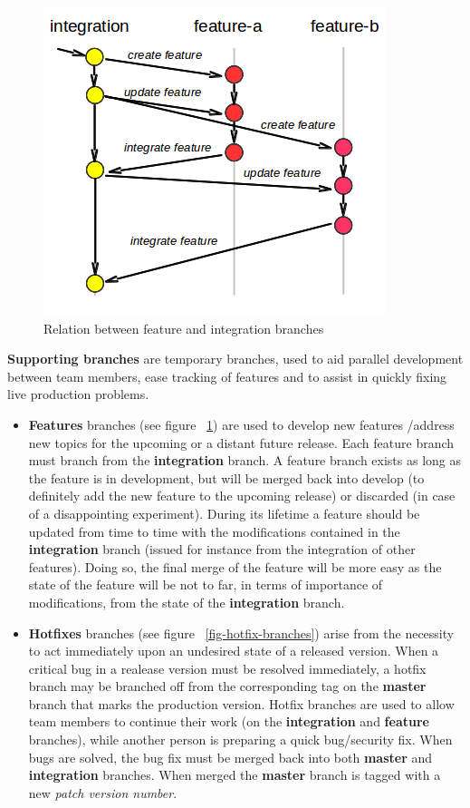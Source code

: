 \documentclass[12pt,a4paper]{article}
\begin{document}
\begin{figure}
\center
\includegraphics[scale=1]{images/feature_branching.png}
\caption{Relation between feature and integration branches}
\label{fig-feature-branches}
\end{figure}

\textbf{Supporting branches} are temporary branches, used to aid parallel development between team members, ease tracking of features and to assist in quickly fixing live production problems.
\begin{itemize}
\item \textbf{Features} branches (see figure ~\ref{fig-feature-branches}) are used to develop new features /address new topics for the upcoming or a distant future release. Each feature branch must branch from the \textbf{integration} branch. A feature branch exists as long as the feature is in development, but will be merged back into develop (to definitely add the new feature to the upcoming release) or discarded (in case of a disappointing experiment). During its lifetime a feature should be updated from time to time with the modifications contained in the \textbf{integration} branch (issued for instance from the integration of other features). Doing so, the final merge of the feature will be more easy as the state of the feature will be not to far, in terms of importance of modifications, from the state of the \textbf{integration} branch.
\item \textbf{Hotfixes} branches (see figure ~\ref{fig-hotfix-branches}) arise from the necessity to act immediately upon an undesired state of a released version. When a critical bug in a realease version must be resolved immediately, a hotfix branch may be branched off from the corresponding tag on the \textbf{master} branch that marks the production version. Hotfix branches are used to allow team members to continue their work (on the \textbf{integration} and \textbf{feature} branches), while another person is preparing a quick bug/security fix. When bugs are solved, the bug fix must be merged back into both \textbf{master} and \textbf{integration} branches. When merged the \textbf{master} branch is tagged with a new \textit{patch version number}.
\end{itemize}
\end{document}

